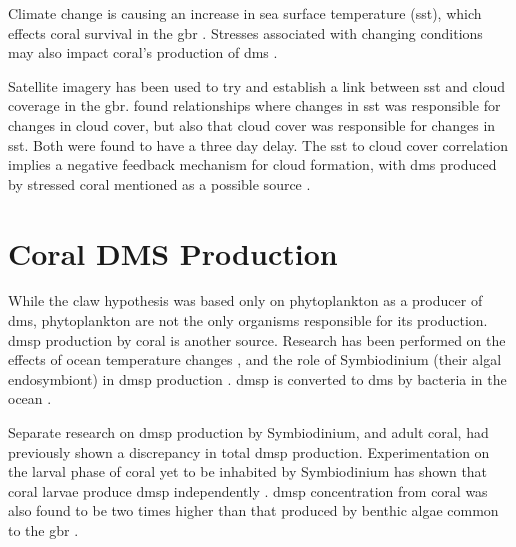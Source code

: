 	Climate change is causing an increase in sea surface temperature (\gls{sst}), which effects coral survival in the \gls{gbr} \citep{hoeghguldberg:1999bi}. Stresses associated with changing conditions may also impact coral's production of \gls{dms} \citep{raina:2013fj}.

	Satellite imagery has been used to try and establish a link between \gls{sst} and cloud coverage in the \gls{gbr}. \citet{leahy:2013en} found relationships where changes in \gls{sst} was responsible for changes in cloud cover, but also that cloud cover was responsible for changes in \gls{sst}. Both were found to have a three day delay. The \gls{sst} to cloud cover correlation implies a negative feedback mechanism for cloud formation, with \gls{dms} produced by stressed coral mentioned as a possible source \citep{leahy:2013en}.


	\section{Coral DMS Production}
	\label{subsec:coraldms}

	While the \gls{claw} hypothesis was based only on phytoplankton as a producer of \gls{dms}, phytoplankton are not the only organisms responsible for its production. \gls{dmsp} production by coral is another source. Research has been performed on the effects of ocean temperature changes \citep{jones2007factors}, and the role of Symbiodinium (their algal endosymbiont) in \gls{dmsp} production \citep{raina:2013fj}. \gls{dmsp} is converted to \gls{dms} by bacteria in the ocean \citep{todd2007structural}.

	Separate research on \gls{dmsp} production by Symbiodinium, and adult coral, had previously shown a discrepancy in total \gls{dmsp} production. Experimentation on the larval phase of coral yet to be inhabited by Symbiodinium has shown that coral larvae produce \gls{dmsp} independently \citep{raina:2013fj}. \gls{dmsp} concentration from coral was also found to be two times higher than that produced by benthic algae common to the \gls{gbr} \citep{raina:2013fj}. 


